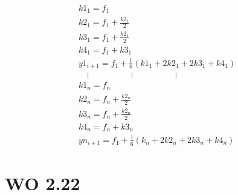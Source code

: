 \documentclass[a4paper]{article}
\begin{document}
\begin{equation}
\begin{aligned}
k1_1 = f_1 \\
k2_1 = f_1 +  \frac{k2_1} {2} \\
k3_1 = f_1 +  \frac{k2_1} {2} \\
k4_1 = f_1 +  k3_1 \\
y1_{i+1} = f_1 + \frac{1} {6}(k1_1 + 2k2_1 + 2k3_1 + k4_1) \\
\quad \vdots \quad \quad \quad \quad \quad \vdots \quad \quad \quad \quad  \quad \vdots \\
k1_n = f_n \\
k2_n = f_n +  \frac{k2_n} {2} \\
k3_n = f_n +  \frac{k2_n} {2} \\
k4_n = f_n +  k3_n \\
yn_{i+1} = f_1 + \frac{1} {6}(k_n + 2k2_n + 2k3_n + k4_n) 
\end{aligned}
\end{equation}


\section*{WO 2.22}
\end{document}
